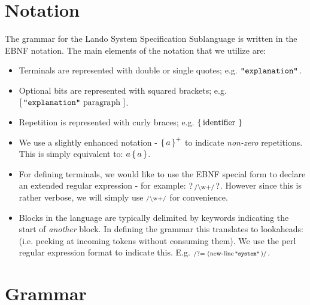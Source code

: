 \documentclass{article}
\begin{document}
\section{Notation}

The grammar for the Lando System Specification Sublanguage is written in the EBNF notation. The main elements of the notation that we utilize are:
\begin{itemize}
  \item Terminals are represented with double or single quotes; e.g. $\mathop{\texttt{"explanation"}}\,$.
  \item Optional bits are represented with squared brackets; e.g. $\mathop{\operatorname{[} \mathop{\texttt{"explanation"}}\, \mathop{\textrm{paragraph}}\, \operatorname{]}}$.
  \item Repetition is represented with curly braces; e.g. $\mathop{\operatorname{\{} \mathop{\textrm{identifier}}\, \operatorname{\}}}$
  \item We use a slightly enhanced notation - $\mathop{\operatorname{\{} a \operatorname{\}}^+}$ to indicate \emph{non-zero} repetitions. This is simply equivalent to: $a \mathop{\operatorname{\{} a \operatorname{\}}}$.
  \item For defining terminals, we would like to use the EBNF special form to declare an extended regular expression - for example: $\mathop{?\, \textrm{\scriptsize /\textbackslash w\\+/} \,?}$. However since this is rather verbose, we will simply use $\textrm{\scriptsize /\textrm{\textbackslash w\\+}/}$ for convenience.
  \item Blocks in the language are typically delimited by keywords indicating the start of \emph{another} block. In defining the grammar this translates to lookaheads: (i.e. peeking at incoming tokens without consuming them). We use the perl regular expression format to indicate this. E.g. $\textrm{\scriptsize /?= (\ensuremath{\mathop{\textrm{new-line}}}\,\ensuremath{\mathop{\texttt{"system"}}}\,)/}$.
\end{itemize}

\section{Grammar}
\end{document}
